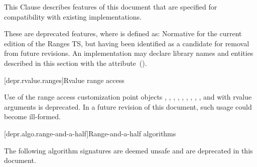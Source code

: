 
\pnum
This Clause describes features of this document that are specified for compatibility with
existing implementations.

\pnum
These are deprecated features, where
is defined as:
Normative for the current edition of the Ranges TS,
but having been identified as a candidate for removal from future revisions.
An implementation may declare library names and entities described in this section with the
 attribute~().

[depr.rvalue.ranges]{Rvalue range access}

\pnum
Use of the range access customization point objects
, ,
, ,
, ,
, ,
, and 
with rvalue arguments is deprecated. In a future revision of this document,
such usage could become ill-formed.

[depr.algo.range-and-a-half]{Range-and-a-half algorithms}

\pnum
The following algorithm signatures are deemed unsafe and are deprecated in this document.

